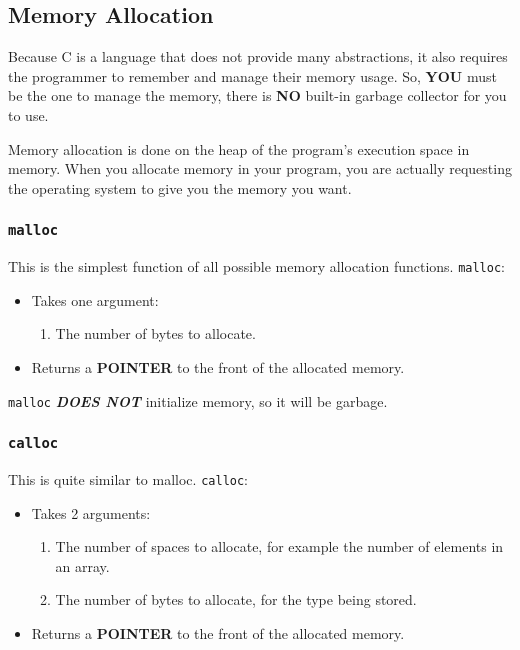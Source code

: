 \subsection{Memory Allocation}\label{subsec:Memory_Allocation}
Because C is a language that does not provide many abstractions, it also requires the programmer to remember and manage their memory usage.
So, \textbf{YOU} must be the one to manage the memory, there is \textbf{NO} built-in garbage collector for you to use.

Memory allocation is done on the heap of the program's execution space in memory.
When you allocate memory in your program, you are actually requesting the operating system to give you the memory you want.

\subsubsection{\texttt{malloc}}\label{subsubec:malloc}
This is the simplest function of all possible memory allocation functions.
\texttt{malloc}:
\begin{itemize}
\item Takes one argument:
  \begin{enumerate}
  \item The number of bytes to allocate.
  \end{enumerate}
\item Returns a \textbf{POINTER} to the front of the allocated memory.
\end{itemize}

\texttt{malloc} {\large{\textbf{\emph{DOES NOT}}}} initialize memory, so it will be garbage.

\subsubsection{\texttt{calloc}}\label{subsubsec:calloc}
This is quite similar to malloc.
\texttt{calloc}:
\begin{itemize}
\item Takes 2 arguments:
  \begin{enumerate}
  \item The number of spaces to allocate, for example the number of elements in an array.
  \item The number of bytes to allocate, for the type being stored.
  \end{enumerate}
\item Returns a \textbf{POINTER} to the front of the allocated memory.
\end{itemize}

